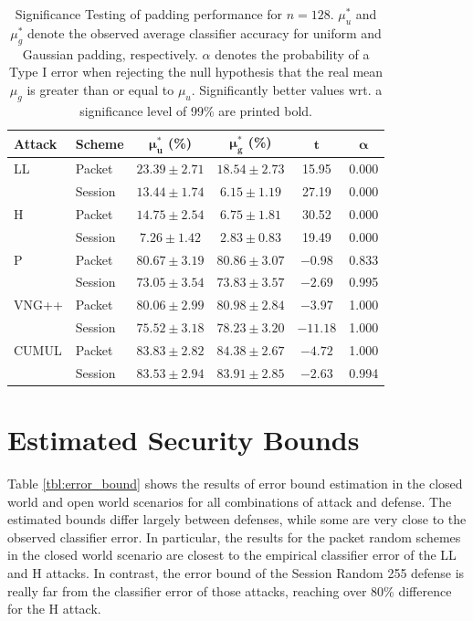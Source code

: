 \documentclass[
	ruledheaders=chapter,
	class=report,
	thesis={type=master, department=inf},
	accentcolor=1c,
	custommargins=true,
	marginpar=false,
	parskip=half-,
	fontsize=11pt,
]{tudapub}
\begin{document}
	\begin{table}
		\centering
		\small
		\begin{tabular}{llcccc}
			\toprule \textbf{Attack} & \textbf{Scheme} & $\mathbf{\mu^*_{u}}$ \textbf{(\%)} & $\mathbf{\mu^*_{g}}$  \textbf{(\%)} & $\mathbf{t}$ & $\mathbf{\alpha}$ \\
			\midrule LL & Packet & $23.39 \pm 2.71$ & $\mathbf{18.54 \pm 2.73}$ & 15.95 & 0.000\\
			 & Session & $13.44 \pm 1.74$ & $\mathbf{6.15 \pm 1.19}$ & 27.19 &  0.000\\ \addlinespace
			H & Packet & $14.75 \pm 2.54$ & $\mathbf{6.75 \pm 1.81}$ & 30.52 & 0.000 \\
			& Session & $7.26 \pm 1.42$ & $\mathbf{2.83 \pm 0.83}$ & 19.49 & 0.000 \\ \addlinespace
			P & Packet & $80.67 \pm 3.19$ & $80.86 \pm 3.07$ & $-0.98$ & 0.833 \\
			& Session & $\mathbf{73.05 \pm 3.54}$ & $73.83 \pm 3.57$ & $-2.69$ & 0.995 \\ \addlinespace
			VNG++ & Packet & $\mathbf{80.06 \pm 2.99}$ & $80.98 \pm 2.84$ & $-3.97$ & 1.000 \\
			& Session & $\mathbf{75.52 \pm 3.18}$ & $78.23 \pm 3.20$ & $-11.18$ & 1.000 \\ \addlinespace
			CUMUL & Packet & $\mathbf{83.83\pm 2.82}$ & $84.38 \pm 2.67$ & $-4.72$ & 1.000\\
			& Session & $83.53 \pm 2.94$ & $83.91 \pm 2.85$ & $-2.63$ & 0.994 \\
			\bottomrule
		\end{tabular}
		\caption[Significance Testing of padding performance for $n = 128$]{Significance Testing of padding performance for $n = 128$. $\mu^*_u$ and $\mu^*_g$ denote the observed average classifier accuracy for uniform and Gaussian padding, respectively. $\alpha$ denotes the probability of a Type I error when rejecting the null hypothesis that the real mean $\mu_g$ is greater than or equal to $\mu_u$. Significantly better values wrt. a significance level of 99\% are printed bold. }
		\label{tbl:sig_score}
	\end{table}

	\section{Estimated Security Bounds}
	\label{security_bounds}
	
	Table \ref{tbl:error_bound} shows the results of error bound estimation in the closed world and open world scenarios for all combinations of attack and defense. The estimated bounds differ largely between defenses, while some are very close to the observed classifier error. In particular, the results for the packet random schemes in the closed world scenario are closest to the empirical classifier error of the LL and H attacks. In contrast, the error bound of the Session Random 255 defense is really far from the classifier error of those attacks, reaching over 80\% difference for the H attack. 
	
\end{document}
